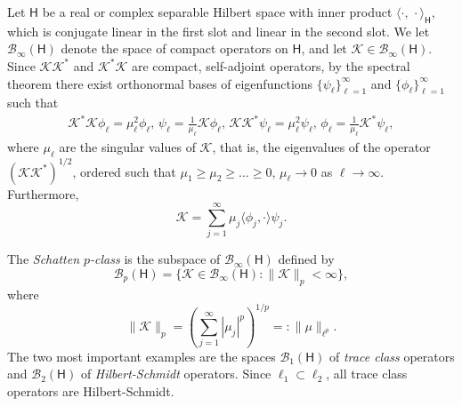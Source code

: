\documentclass{birkjour}
\theoremstyle{definition}
\theoremstyle{remark}
\numberwithin{equation}{section}
\newcommand{\cB}{{\mathcal B}}
\newcommand{\cK}{{\mathcal K}}
\newcommand{\sH}{{\mathsf H}}
\begin{document}
Let $\mathsf{H}$ be a real or complex separable 
Hilbert space with inner product $\langle \cdot, \, \cdot\rangle_\sH$, which is conjugate linear in the first slot and linear in the second slot.  
We let $\cB_\infty(\sH)$ denote the space of compact operators on $\sH$,
and let  $\cK\in \cB_\infty (\sH)$.
Since $\cK\cK^*$ and $\cK^*\cK$ are compact, self-adjoint operators, 
by the spectral theorem there exist orthonormal bases of eigenfunctions 
$\{\psi_\ell\}_{\ell=1}^\infty$ and $\{\phi_\ell\}_{\ell=1}^\infty$ such that 
\begin{align}
\label{KK1}
\cK^*\cK\phi_\ell=\mu_\ell^2\phi_\ell, \,\psi_\ell=\frac1{\mu_\ell}\cK\phi_\ell,\,
\cK\cK^*\psi_\ell=\mu_\ell^2\psi_\ell,\, \phi_\ell=\frac1{\mu_\ell}\cK^*\psi_\ell,
\end{align}
where $\mu_\ell$ are the singular values of  $\cK$, that is, the eigenvalues of the operator $(\cK\cK^*)^{1/2}$, ordered such that $\mu_1\ge\mu_2\ge\dots \geq 0$, $\mu_\ell\to0$ as $\ell\to\infty$.
Furthermore,
\begin{equation}\label{Kdecomp}
    \mathcal{K} = \sum_{j=1}^\infty \mu_j \langle \phi_j, \cdot \rangle \psi_j.
\end{equation}

The \emph{Schatten $p$-class} is the subspace of $\cB_\infty(\sH)$ defined by 
\begin{equation}
    \mathcal{B}_p(\sH) = \{ \mathcal{K} \in \cB_\infty(\sH) : \|\mathcal{K}\|_p < \infty\}, 
\end{equation}
where 
\begin{equation}
    \|\mathcal{K}\|_p = \left( \sum_{j=1}^{\infty} |\mu_j|^p \right)^{1/p} =: \|\mu\|_{\ell^p}.
\end{equation}
The two most important examples are the spaces $\cB_1(\sH)$  of \emph{trace class} operators and  $\cB_2(\sH)$ of \emph{Hilbert-Schmidt} operators. Since $\ell_1 \subset \ell_2$, all trace class
operators are Hilbert-Schmidt.
\end{document}
